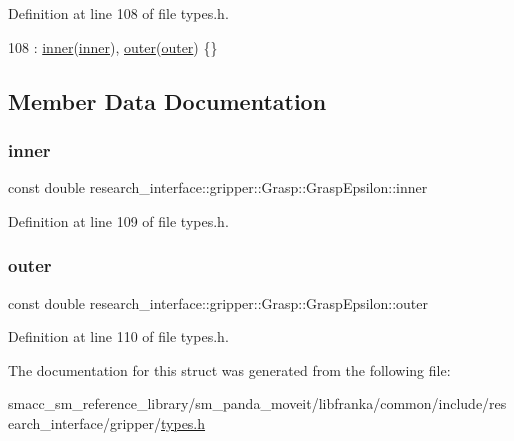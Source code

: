 Definition at line 108 of file types.\+h.


\begin{DoxyCode}
108 : \hyperlink{structresearch__interface_1_1gripper_1_1Grasp_1_1GraspEpsilon_a380022de09288513e27ee07b3779ebec}{inner}(\hyperlink{structresearch__interface_1_1gripper_1_1Grasp_1_1GraspEpsilon_a380022de09288513e27ee07b3779ebec}{inner}), \hyperlink{structresearch__interface_1_1gripper_1_1Grasp_1_1GraspEpsilon_a9d00f5f20a740391ce1c622b0c93fcf3}{outer}(\hyperlink{structresearch__interface_1_1gripper_1_1Grasp_1_1GraspEpsilon_a9d00f5f20a740391ce1c622b0c93fcf3}{outer}) \{\}
\end{DoxyCode}


\subsection{Member Data Documentation}
\mbox{\label{structresearch__interface_1_1gripper_1_1Grasp_1_1GraspEpsilon_a380022de09288513e27ee07b3779ebec}} 
\subsubsection{\texorpdfstring{inner}{inner}}
{\footnotesize\ttfamily const double research\+\_\+interface\+::gripper\+::\+Grasp\+::\+Grasp\+Epsilon\+::inner}



Definition at line 109 of file types.\+h.

\mbox{\label{structresearch__interface_1_1gripper_1_1Grasp_1_1GraspEpsilon_a9d00f5f20a740391ce1c622b0c93fcf3}} 
\subsubsection{\texorpdfstring{outer}{outer}}
{\footnotesize\ttfamily const double research\+\_\+interface\+::gripper\+::\+Grasp\+::\+Grasp\+Epsilon\+::outer}



Definition at line 110 of file types.\+h.



The documentation for this struct was generated from the following file\+:\begin{DoxyCompactItemize}
\item 
smacc\+\_\+sm\+\_\+reference\+\_\+library/sm\+\_\+panda\+\_\+moveit/libfranka/common/include/research\+\_\+interface/gripper/\hyperlink{types_8h}{types.\+h}\end{DoxyCompactItemize}
